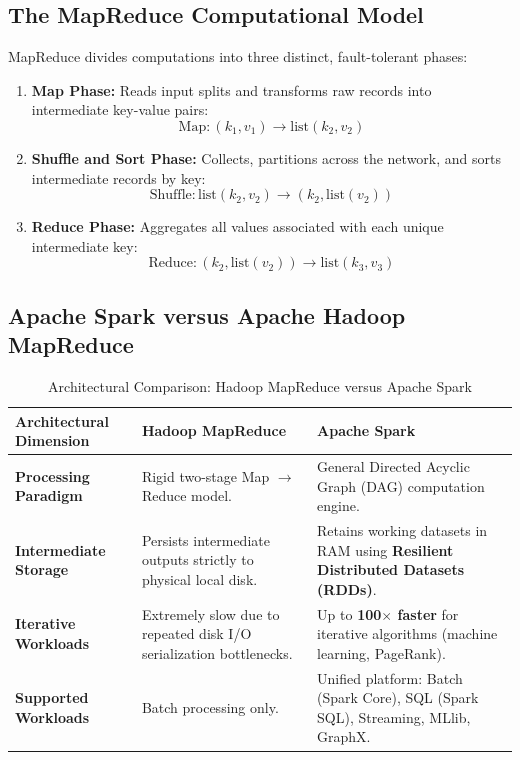\subsection{The MapReduce Computational Model}
MapReduce divides computations into three distinct, fault-tolerant phases:
\begin{enumerate}
    \item \textbf{Map Phase:} Reads input splits and transforms raw records into intermediate key-value pairs:
    \[
    \text{Map}: (k_1, v_1) \to \text{list}(k_2, v_2)
    \]
    \item \textbf{Shuffle and Sort Phase:} Collects, partitions across the network, and sorts intermediate records by key:
    \[
    \text{Shuffle}: \text{list}(k_2, v_2) \to (k_2, \text{list}(v_2))
    \]
    \item \textbf{Reduce Phase:} Aggregates all values associated with each unique intermediate key:
    \[
    \text{Reduce}: (k_2, \text{list}(v_2)) \to \text{list}(k_3, v_3)
    \]
\end{enumerate}

\subsection{Apache Spark versus Apache Hadoop MapReduce}
\begin{table}[htbp]
\centering
\small
\caption{Architectural Comparison: Hadoop MapReduce versus Apache Spark}
\label{tab:mapreduce_vs_spark}
\begin{tabularx}{\textwidth}{p{3.2cm} X X}
\toprule
\textbf{Architectural Dimension} & \textbf{Hadoop MapReduce} & \textbf{Apache Spark} \\
\midrule
\textbf{Processing Paradigm} & Rigid two-stage Map $\to$ Reduce model. & General Directed Acyclic Graph (DAG) computation engine. \\
\textbf{Intermediate Storage} & Persists intermediate outputs strictly to physical local disk. & Retains working datasets in RAM using \textbf{Resilient Distributed Datasets (RDDs)}. \\
\textbf{Iterative Workloads} & Extremely slow due to repeated disk I/O serialization bottlenecks. & Up to \textbf{100$\times$ faster} for iterative algorithms (machine learning, PageRank). \\
\textbf{Supported Workloads} & Batch processing only. & Unified platform: Batch (Spark Core), SQL (Spark SQL), Streaming, MLlib, GraphX. \\
\bottomrule
\end{tabularx}
\end{table}

